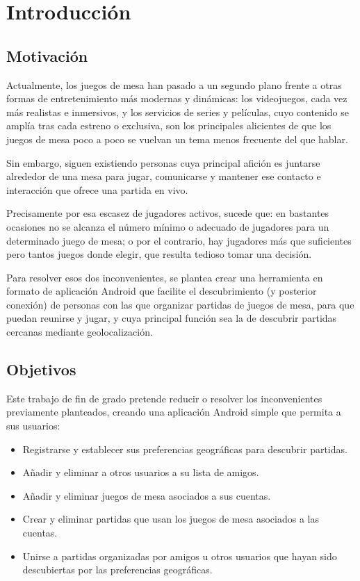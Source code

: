 \chapter{Introducción}

    \section{Motivación}

        Actualmente, los juegos de mesa han pasado a un segundo plano frente a otras formas de entretenimiento más modernas y dinámicas: los videojuegos, cada vez más realistas e inmersivos, y los servicios de series y películas, cuyo contenido se amplía tras cada estreno o exclusiva, son los principales alicientes de que los juegos de mesa poco a poco se vuelvan un tema menos frecuente del que hablar.

        Sin embargo, siguen existiendo personas cuya principal afición es juntarse alrededor de una mesa para jugar, comunicarse y mantener ese contacto e interacción que ofrece una partida en vivo.

        Precisamente por esa escasez de jugadores activos, sucede que: en bastantes ocasiones no se alcanza el número mínimo o adecuado de jugadores para un determinado juego de mesa; o por el contrario, hay jugadores más que suficientes pero tantos juegos donde elegir, que resulta tedioso tomar una decisión.

        Para resolver esos dos inconvenientes, se plantea crear una herramienta en formato de aplicación Android que facilite el descubrimiento (y posterior conexión) de personas con las que organizar partidas de juegos de mesa, para que puedan reunirse y jugar, y cuya principal función sea la de descubrir partidas cercanas mediante geolocalización.


    \section{Objetivos}

        Este trabajo de fin de grado pretende reducir o resolver los inconvenientes previamente planteados, creando una aplicación Android simple que permita a sus usuarios:

        \begin{itemize}

            \item Registrarse y establecer sus preferencias geográficas para descubrir partidas.
            \item Añadir y eliminar a otros usuarios a su lista de amigos.
            \item Añadir y eliminar juegos de mesa asociados a sus cuentas.
            \item Crear y eliminar partidas que usan los juegos de mesa asociados a las cuentas.
            \item Unirse a partidas organizadas por amigos u otros usuarios que hayan sido descubiertas por las preferencias geográficas.

        \end{itemize}

